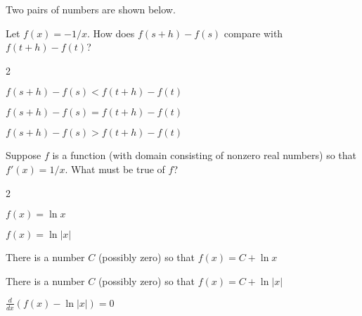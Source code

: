 \documentclass[12pt]{ximera}
\renewenvironment{multipleChoice}
{\begin{trivlist}\item[\hskip\labelsep\small\bfseries Choose the best answer:]
\hfil\begin{enumerate}\begin{multicols}{2}}
 {\end{multicols}\end{enumerate}\end{trivlist}}
\renewcommand{\choice}[2][]{\item \begin{minipage}[t]{2in}#2\end{minipage}\ifthenelse{\boolean{#1}}{\ifhandout \else  \fi}{}}
\begin{document}
\vspace{6ex}

\begin{minipage}{\textwidth}
\begin{problem}
  Two pairs of numbers are shown below.
  \begin{image}
  \end{image}
  Let $f(x) = -1/x$.  How does $f(s+h)-f(s)$ compare with $f(t+h) - f(t)$?
  \begin{multipleChoice}
    \choice{$f(s+h) - f(s) < f(t+h) - f(t)$}
    \choice{$f(s+h) - f(s) = f(t+h) - f(t)$}
    \choice[correct]{$f(s+h) - f(s) > f(t+h) - f(t)$}
  \end{multipleChoice}
\end{problem}
\end{minipage}

\vspace{6ex}

\begin{minipage}{\textwidth}
\begin{problem}
  Suppose $f$ is a function (with domain consisting of nonzero real numbers) so that $f'(x) = 1/x$.  What must be true of $f$?
  \begin{multipleChoice}
    \choice{$f(x) = \ln x$}
    \choice{$f(x) = \ln |x|$}
    \choice{There is a number $C$ (possibly zero) so that $f(x) = C + \ln x$}
    \choice{There is a number $C$ (possibly zero) so that $f(x) = C + \ln |x|$}
    \choice[correct]{$\frac{d}{dx} \left( f(x) - \ln |x| \right) = 0$}
  \end{multipleChoice}
\end{problem}
\end{minipage}

\vspace{6ex}
\end{document}
